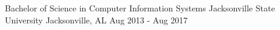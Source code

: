
\begin{cventries}
  \cventry
    {Bachelor of Science in Computer Information Systems} %
    {Jacksonville State University} %
    {Jacksonville, AL} %
    {Aug 2013 - Aug 2017} %
\end
{cventries}
